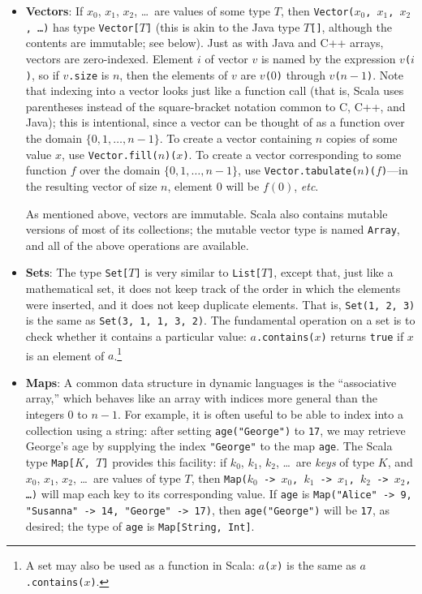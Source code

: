 \begin{itemize}
\item \textbf{Vectors}: If $x_0$, $x_1$, $x_2$, \ldots\ are values of some type $T$, then \texttt{Vector($x_0$, $x_1$, $x_2$, \ldots)} has type \texttt{Vector[$T$]} (this is akin to the Java type $T$\verb|[]|, although the contents are immutable; see below). Just as with Java and C++ arrays, vectors are zero-indexed. Element $i$ of vector $v$ is named by the expression \texttt{$v$($i$)}, so if \texttt{$v$.size} is $n$, then the elements of $v$ are \texttt{$v$($0$)} through \texttt{$v$($n-1$)}. Note that indexing into a vector looks just like a function call (that is, Scala uses parentheses instead of the  square-bracket notation common to C, C++, and Java); this is intentional, since a vector can be thought of as a function over the domain $\{0, 1, \ldots, n-1\}$. To create a vector containing $n$ copies of some value $x$, use \texttt{Vector.fill($n$)($x$)}. To create a vector corresponding to some function $f$ over the domain $\{0, 1, \ldots, n-1\}$, use \texttt{Vector.tabulate($n$)($f$)}---in the resulting vector of size $n$, element $0$ will be $f(0)$, \textit{etc}.

As mentioned above, vectors are immutable. Scala also contains mutable versions of most of its collections; the mutable vector type is named \verb|Array|, and all of the above operations are available.

\item \textbf{Sets}: The type \texttt{Set[$T$]} is very similar to \texttt{List[$T$]}, except that, just like a mathematical set, it does not keep track of the order in which the elements were inserted, and it does not keep duplicate elements. That is, \texttt{Set(1, 2, 3)} is the same as \texttt{Set(3, 1, 1, 3, 2)}. The fundamental operation on a set is to check whether it contains a particular value: \texttt{$a$.contains($x$)} returns \texttt{true} if $x$ is an element of $a$.\footnote{A set may also be used as a function in Scala: \texttt{$a$($x$)} is the same as \texttt{$a$.contains($x$)}.}

\item \textbf{Maps}: A common data structure in dynamic languages is the ``associative array,'' which behaves like an array with indices more general than the integers 0 to $n-1$. For example, it is often useful to be able to index into a collection using a string: after setting \texttt{age("George")} to \texttt{17}, we may retrieve George's age by supplying the index \texttt{"George"} to the map \texttt{age}. The Scala type \texttt{Map[$K$, $T$]} provides this facility: if $k_0$, $k_1$, $k_2$, \ldots\ are \emph{keys} of type $K$, and $x_0$, $x_1$, $x_2$, \ldots\ are values of type $T$, then \texttt{Map($k_0$ -> $x_0$, $k_1$ -> $x_1$, $k_2$ -> $x_2$, \ldots)} will map each key to its corresponding value. If \texttt{age} is \texttt{Map("Alice" -> 9, "Susanna" -> 14, "George" -> 17)}, then \texttt{age("George")} will be \texttt{17}, as desired; the type of \texttt{age} is \texttt{Map[String, Int]}.


\end{itemize}
